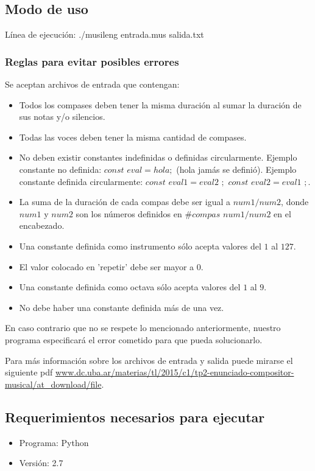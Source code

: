 \subsection{Modo de uso}
Línea de ejecución: ./musileng entrada.mus salida.txt

\subsubsection{Reglas para evitar posibles errores}
Se aceptan archivos de entrada que contengan:
\begin{itemize}
\item Todos los compases deben tener la misma duración al sumar la duración de sus notas y/o silencios.
\item Todas las voces deben tener la misma cantidad de compases.
\item No deben existir constantes indefinidas o definidas circularmente. Ejemplo constante no definida: $const$ $eval = hola;$ (hola jamás se definió). Ejemplo constante definida circularmente: $const$ $eval1 = eval2$ $;$ $const$ $eval2 = eval1$ $;$.
\item La suma de la duración de cada compas debe ser igual a $num1/num2$, donde $num1$ y $num2$ son los números definidos en $\#compas$ $num1/num2$ en el encabezado.
\item Una constante definida como instrumento sólo acepta valores del $1$ al $127$.
\item El valor colocado en 'repetir' debe ser mayor a $0$.
\item Una constante definida como octava sólo acepta valores del $1$ al $9$.
\item No debe haber una constante definida más de una vez.
\end{itemize}
En caso contrario que no se respete lo mencionado anteriormente, nuestro programa especificará el error cometido para que pueda solucionarlo.

Para más información sobre los archivos de entrada y salida puede mirarse el siguiente pdf \url{www.dc.uba.ar/materias/tl/2015/c1/tp2-enunciado-compositor-musical/at_download/file}.

\subsection{Requerimientos necesarios para ejecutar}
\begin{itemize}
\item Programa: Python
\item Versión: 2.7
\end{itemize}

